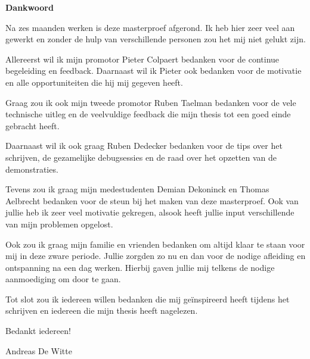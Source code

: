 \thispagestyle{empty}    %
\textbf{Dankwoord}

Na zes maanden werken is deze masterproef afgerond. Ik heb hier zeer veel aan gewerkt en zonder de hulp van verschillende personen zou het mij niet gelukt zijn.

Allereerst wil ik mijn promotor Pieter Colpaert bedanken voor de continue begeleiding en feedback. Daarnaast wil ik Pieter ook bedanken voor de motivatie en alle opportuniteiten die hij mij gegeven heeft. 

Graag zou ik ook mijn tweede promotor Ruben Taelman bedanken voor de vele technische uitleg en de veelvuldige feedback die mijn thesis tot een goed einde gebracht heeft.

Daarnaast wil ik ook graag Ruben Dedecker bedanken voor de tips over het schrijven, de gezamelijke debugsessies en de raad over het opzetten van de demonstraties.

Tevens zou ik graag mijn medestudenten Demian Dekoninck en Thomas Aelbrecht bedanken voor de steun bij het maken van deze masterproef. Ook van jullie heb ik zeer veel motivatie gekregen, alsook heeft jullie input verschillende van mijn problemen opgelost.

Ook zou ik graag mijn familie en vrienden bedanken om altijd klaar te staan voor mij in deze zware periode. Jullie zorgden zo nu en dan voor de nodige afleiding en ontspanning na een dag werken. Hierbij gaven jullie mij telkens de nodige aanmoediging om door te gaan.

Tot slot zou ik iedereen willen bedanken die mij geïnspireerd heeft tijdens het schrijven en iedereen die mijn thesis heeft nagelezen. 

Bedankt iedereen!

Andreas De Witte